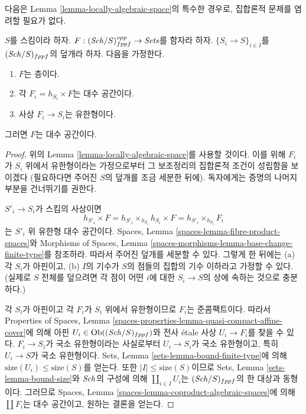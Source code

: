 \noindent
다음은 Lemma \ref{lemma-locally-algebraic-space}의 특수한 경우로,
집합론적 문제를 염려할 필요가 없다.

\begin{lemma}
\label{lemma-locally-algebraic-space-finite-type}
$S$를 스킴이라 하자.
$F : (\mathit{Sch}/S)_{fppf}^{opp} \to \textit{Sets}$를 함자라 하자.
$\{S_i \to S\}_{i \in I}$를 $(\mathit{Sch}/S)_{fppf}$의 덮개라 하자.
다음을 가정한다.
\begin{enumerate}
\item $F$는 층이다.
\item 각 $F_i = h_{S_i} \times F$는 대수 공간이다.
\item 사상 $F_i \to S_i$는 유한형이다.
\end{enumerate}
그러면 $F$는 대수 공간이다.
\end{lemma}

\begin{proof}
위의 Lemma \ref{lemma-locally-algebraic-space}를 사용할 것이다.
이를 위해 $F_i$가 $S_i$ 위에서 유한형이라는 가정으로부터
그 보조정리의 집합론적 조건이 성립함을 보이겠다
(필요하다면 주어진 $S$의 덮개를 조금 세분한 뒤에).
독자에게는 증명의 나머지 부분을 건너뛰기를 권한다.

\medskip\noindent
$S'_i \to S_i$가 스킴의 사상이면
$$
h_{S'_i} \times F =
h_{S'_i} \times_{h_{S_i}} h_{S_i} \times F =
h_{S'_i} \times_{h_{S_i}} F_i
$$
는 $S'_i$ 위 유한형 대수 공간이다. Spaces, Lemma
\ref{spaces-lemma-fibre-product-spaces}와 Morphisms of Spaces,
Lemma \ref{spaces-morphisms-lemma-base-change-finite-type}를 참조하라.
따라서 주어진 덮개를 세분할 수 있다. 그렇게 한 뒤에는
(a) 각 $S_i$가 아핀이고, (b) $I$의 기수가 $S$의 점들의 집합의
기수 이하라고 가정할 수 있다.
(실제로 $S$ 전체를 덮으려면 각 점이 어떤 $i$에 대한
$S_i \to S$의 상에 속하는 것으로 충분하다.)

\medskip\noindent
각 $S_i$가 아핀이고 각 $F_i$가 $S_i$ 위에서 유한형이므로
$F_i$는 준콤팩트이다. 따라서 Properties of Spaces,
Lemma \ref{spaces-properties-lemma-quasi-compact-affine-cover}에 의해
아핀 $U_i \in \mathop{\mathrm{Ob}}\nolimits((\mathit{Sch}/S)_{fppf})$와 전사 \'etale 사상
$U_i \to F_i$를 찾을 수 있다.
$F_i \to S_i$가 국소 유한형이라는 사실로부터
$U_i \to S_i$가 국소 유한형이고, 특히 $U_i \to S$가 국소 유한형이다.
Sets, Lemma \ref{sets-lemma-bound-finite-type}에 의해
$\text{size}(U_i) \leq \text{size}(S)$를 얻는다.
또한 $|I| \leq \text{size}(S)$이므로 Sets, Lemma
\ref{sets-lemma-bound-size}와 $\mathit{Sch}$의 구성에 의해
$\coprod_{i \in I} U_i$는 $(\mathit{Sch}/S)_{fppf}$의 한 대상과 동형이다.
그러므로 Spaces, Lemma
\ref{spaces-lemma-coproduct-algebraic-spaces}에 의해
$\coprod F_i$는 대수 공간이고, 원하는 결론을 얻는다.
\end{proof}

